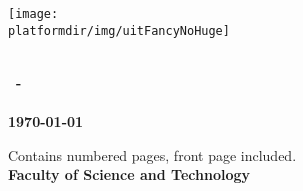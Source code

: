\thispagestyle{empty}
\begin{center}
	\texttt{[image: \\platformdir/img/uitFancyNoHuge]} \\[1.0cm]
	\Large{\exerciseSetName\ \setNo} \\[1.5cm]
\end{center}
\begin{center}
\textbf{\courseCode\ - \courseTitle}\\[1cm]
\textbf{\large\versionText}
\textbf{\authorname} \\[1cm]
\textbf{\today} \\[3cm]
\end{center}



\begin{center}
\vfill
Contains \pageref{LastPage} numbered pages, front page included. \\[0.5cm]
\textbf{Faculty of Science and Technology}
\end{center}
\newpage
